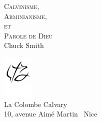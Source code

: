 
\newcommand{\HRule}{\rule{\linewidth}{0.2mm}}

\begin{titlepage}
\begin{center}
\mbox{}
\vfill
\textsc{ \Huge Calvinisme,\\[0.4cm] Arminianisme,\\[0.4cm] et\\[0.4cm] Parole de Dieu}\\[1.5cm]

{\LARGE Chuck Smith}\\[1cm]
\vfill

\includegraphics[width=4em]{revival_potrace} \\[-5mm]
\logofont\large La Colombe Calvary \\
\normalfont\normalsize 10, avenue Aimé Martin ~Nice\\

\end{center}
\end{titlepage}

